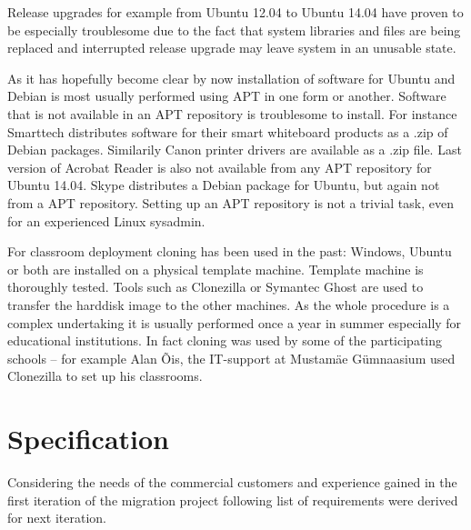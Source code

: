 \documentclass[a4paper,11pt]{kth-mag}
\begin{document}
Release upgrades for example from Ubuntu 12.04 to Ubuntu 14.04
have proven to be especially troublesome due to the fact that system libraries
and files are being replaced and interrupted release upgrade may leave system
in an unusable state.

As it has hopefully become clear by now
installation of software for Ubuntu and Debian
is most usually performed using APT in one form or another.
Software that is not available in an APT repository
is troublesome to install.
For instance Smarttech distributes software for their smart
whiteboard products as a .zip of Debian packages.
Similarily Canon printer drivers are available as a .zip file.
Last version of Acrobat Reader is also not available
from any APT repository for Ubuntu 14.04.
Skype distributes a Debian package for Ubuntu, but again
not from a APT repository.
Setting up an APT repository is not a trivial task,
even for an experienced Linux sysadmin.


For classroom deployment cloning has been used in the past:
Windows, Ubuntu or both are installed on a physical template machine.
Template machine is thoroughly tested.
Tools such as Clonezilla \cite{clonezilla} or Symantec Ghost are used to transfer the
harddisk image to the other machines.
As the whole procedure is a complex undertaking
it is usually performed once a year in summer especially for
educational institutions.
In fact cloning was used by some of the participating
schools -- for example Alan Õis, the IT-support at Mustamäe Gümnaasium
used Clonezilla to set up his classrooms.





\section{Specification}

Considering the needs of the commercial customers and
experience gained in the first iteration of the migration project
following list of requirements were derived for next iteration.
\end{document}
